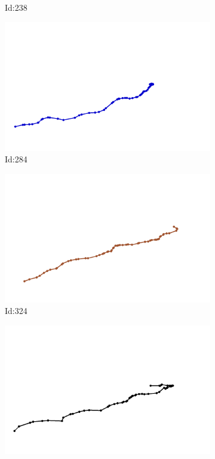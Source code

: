 \documentclass[12pt,twoside]{report}
\begin{document}
\begin{figure}
\begin{subfigure}[b]{0.20\textwidth}
\caption{Id:238}
\end{subfigure}
\begin{subfigure}[b]{0.20\textwidth}
\centering
\includegraphics[width=\textwidth]{../trajectories/284.png}
\caption{Id:284}
\end{subfigure}
\begin{subfigure}[b]{0.20\textwidth}
\centering
\includegraphics[width=\textwidth]{../trajectories/324.png}
\caption{Id:324}
\end{subfigure}
\begin{subfigure}[b]{0.20\textwidth}
\centering
\includegraphics[width=\textwidth]{../trajectories/329.png}

\end{subfigure}
\end{figure}
\end{document}
